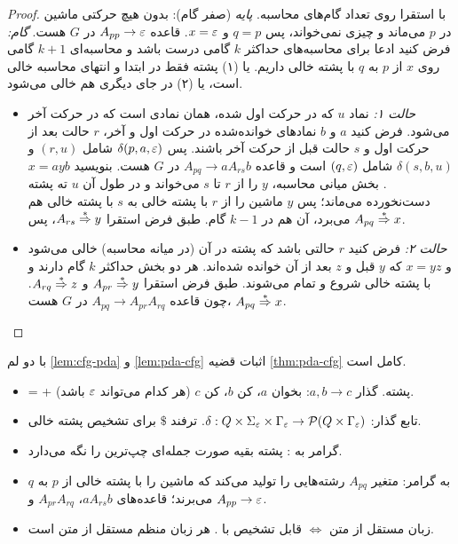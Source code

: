 \begin{proof}
با استقرا روی تعداد گام‌های محاسبه.
\emph{پایه} (صفر گام): بدون هیچ حرکتی ماشین در $p$ می‌ماند و چیزی نمی‌خواند، پس $q=p$ و $x=\varepsilon$. قاعده $A_{pp}\to\varepsilon$ در $G$ هست.
\emph{گام:} فرض کنید ادعا برای محاسبه‌های حداکثر $k$ گامی درست باشد و محاسبه‌ای $k+1$ گامی روی $x$ از $p$ به $q$ با پشته خالی داریم. یا (۱) پشته فقط در ابتدا و انتهای محاسبه خالی است، یا (۲) در جای دیگری هم خالی می‌شود.
\begin{itemize}
\item \emph{حالت ۱:} نماد $u$ که در حرکت اول  شده، همان نمادی است که در حرکت آخر  می‌شود. فرض کنید $a$ و $b$ نمادهای خوانده‌شده در حرکت اول و آخر، $r$ حالت بعد از حرکت اول و $s$ حالت قبل از حرکت آخر باشند. پس $\delta(p,a,\varepsilon)$ شامل $(r,u)$ و $\delta(s,b,u)$ شامل $(q,\varepsilon)$ است و قاعده $A_{pq}\to aA_{rs}b$ در $G$ هست. بنویسید $x=ayb$. بخش میانی محاسبه، $y$ را از $r$ تا $s$ می‌خواند و در طول آن $u$ ته پشته دست‌نخورده می‌ماند؛ پس $y$ ماشین را از $r$ با پشته خالی به $s$ با پشته خالی هم می‌برد، آن هم در $k-1$ گام. طبق فرض استقرا $A_{rs}\overset{*}{\Rightarrow} y$، پس $A_{pq}\overset{*}{\Rightarrow} x$.
\item \emph{حالت ۲:} فرض کنید $r$ حالتی باشد که پشته در آن (در میانه محاسبه) خالی می‌شود و $x=yz$ که $y$ قبل و $z$ بعد از آن خوانده شده‌اند. هر دو بخش حداکثر $k$ گام دارند و با پشته خالی شروع و تمام می‌شوند. طبق فرض استقرا $A_{pr}\overset{*}{\Rightarrow} y$ و $A_{rq}\overset{*}{\Rightarrow} z$. چون قاعده $A_{pq}\to A_{pr}A_{rq}$ در $G$ هست، $A_{pq}\overset{*}{\Rightarrow} x$.\qedhere
\end{itemize}
\end{proof}

با دو لم \ref{lem:cfg-pda} و \ref{lem:pda-cfg} اثبات قضیه \ref{thm:pda-cfg} کامل است.

\begin{summary}
\begin{itemize}
\item {} =  + پشته. گذار $a,b\to c$: بخوان $a$،  کن $b$،  کن $c$ (هر کدام می‌تواند $\varepsilon$ باشد).
\item تابع گذار: $\delta:Q\times\Sigma_\varepsilon\times\Gamma_\varepsilon\to\mathcal{P}(Q\times\Gamma_\varepsilon)$. ترفند $\$$ برای تشخیص پشته خالی.
\item گرامر به : پشته بقیه صورت جمله‌ای چپ‌ترین را نگه می‌دارد.
\item {} به گرامر: متغیر $A_{pq}$ رشته‌هایی را تولید می‌کند که ماشین را با پشته خالی از $p$ به $q$ می‌برند؛ قاعده‌های $aA_{rs}b$، $A_{pr}A_{rq}$ و $A_{pp}\to\varepsilon$.
\item زبان مستقل از متن $\iff$ قابل تشخیص با . هر زبان منظم مستقل از متن است.
\end{itemize}
\end{summary}
